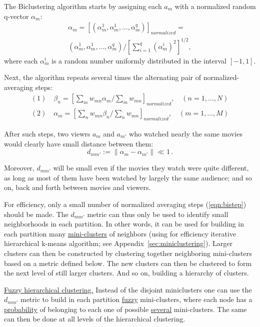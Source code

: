 \documentclass{article} %
\begin{document}
The Biclustering algorithm starts by assigning each $a_m$ with a normalized random q-vector $\alpha_m$:
\begin{equation}
\begin{split}
\alpha_m = \left[ (\alpha_m^1,\alpha_m^1,\ldots,\alpha_m^q) \right]_{normalized} =  \\
(\alpha_m^1,\alpha_m^1,\ldots,\alpha_m^q) /
\left[ \sum_{i=1}^q (\alpha_m^i)^2 \right]^{1/2},
\end{split}
\end{equation}
where each $\alpha_m^i$ is a random number uniformly distributed in the interval $[-1,1]$. 

Next, the algorithm repeats several times the alternating pair of normalized-averaging steps:
\begin{equation}
\begin{split}
(1) \quad \beta_n = \left[ \sum_m w_{mn} \alpha_m / \sum_m w_{mn} \right]_{normalized}, \quad (n=1,\ldots,N) \\
(2) \quad \alpha_m = \left[ \sum_n w_{mn} \beta_n / \sum_n w_{mn} \right]_{normalized}, \quad (m=1,\ldots,M) 
\end{split}
\label{eqn:bistep}
\end{equation}

After such steps, two viewrs $a_m$ and $a_{m'}$ who watched nearly the same movies would clearly have small distance between them:
\begin{equation}
d_{mm'} := \|\alpha_m - \alpha_{m'} \| \ll 1\,.
\end{equation}

Moreover, $d_{mm'}$ will be small even if the movies they watch were quite different, as long as most of them have been watched by largely the same audience; and so on, back and forth between movies and viewers.

For efficiency, only a small number of normalized averaging steps (\ref{eqn:bistep}) should be made. The $d_{mm'}$ metric can thus only be used to identify small neighborhoods in each partition. In other words, it can be used for building in each partition many \underline{mini-clusters} of neighbors (using for efficiency iterative hierarchical k-means algorithm; see Appendix~\ref{sec:miniclustering}). Larger clusters can then be constructed by clustering together neighboring mini-clusters based on a metric defined below. The new clusters can then be clustered to form the next level of still larger clusters. And so on, building a hierarchy of clusters.

\underline{Fuzzy hierarchical clustering.} Instead of the disjoint miniclusters one can use the $d_{mm'}$ metric to build in each partition \underline{fuzzy} mini-clusters, where each node has a \underline{probability} of belonging to each one of possible \underline{several} mini-clusters. The same can then be done at all levels of the hierarchical clustering. 
\end{document}
